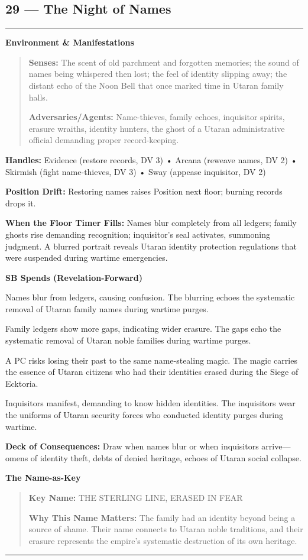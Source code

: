 \documentclass[18pt, letterpaper, twoside]{article}
\newenvironment{floorbox}[1]{%
    \begin{center}
    \begin{minipage}{0.95\textwidth}
    \subsection*{#1}
    \vspace{-0.5em}
    \rule{\textwidth}{0.5pt}
    \vspace{0.5em}
}{%
    \vspace{0.5em}
    \rule{\textwidth}{0.5pt}
    \end{minipage}
    \end{center}
}
\newenvironment{gmnote}[1]{%
    \vspace{0.5em}
    \noindent\textbf{#1}
    \begin{quote}
}{%
    \end{quote}
    \vspace{0.5em}
}
\newcommand{\handles}[1]{\noindent\textbf{Handles:} #1\par}
\newcommand{\sbitem}[2]{\item[#1 SB:] #2}
\newcommand{\deckdraw}[1]{\noindent\textbf{Deck of Consequences:} #1\par}
\newcommand{\keyname}[1]{\noindent\textbf{Key Name:} #1\par}
\newcommand{\nameimportance}[1]{\noindent\textbf{Why This Name Matters:} #1\par}
\begin{document}
\begin{floorbox}{29 --- The Night of Names}
\begin{gmnote}{Environment \& Manifestations}
    \textbf{Senses:} The scent of old parchment and forgotten memories; the sound of names being whispered then lost; the feel of identity slipping away; the distant echo of the Noon Bell that once marked time in Utaran family halls.
    
    \textbf{Adversaries/Agents:} Name-thieves, family echoes, inquisitor spirits, erasure wraiths, identity hunters, the ghost of a Utaran administrative official demanding proper record-keeping.
    \end{gmnote}
    
    \handles{Evidence (restore records, DV 3) • Arcana (reweave names, DV 2) • Skirmish (fight name-thieves, DV 3) • Sway (appease inquisitor, DV 2)}
    
    \textbf{Position Drift:} Restoring names raises Position next floor; burning records drops it.
    
    \textbf{When the Floor Timer Fills:} Names blur completely from all ledgers; family ghosts rise demanding recognition; inquisitor's seal activates, summoning judgment. A blurred portrait reveals Utaran identity protection regulations that were suspended during wartime emergencies.
    
    \textbf{SB Spends (Revelation-Forward)}
    \begin{description}[leftmargin=*, style=unboxed]
        \sbitem{1}{Names blur from ledgers, causing confusion. The blurring echoes the systematic removal of Utaran family names during wartime purges.}
        \sbitem{2}{Family ledgers show more gaps, indicating wider erasure. The gaps echo the systematic removal of Utaran noble families during wartime purges.}
        \sbitem{3}{A PC risks losing their past to the same name-stealing magic. The magic carries the essence of Utaran citizens who had their identities erased during the Siege of Ecktoria.}
        \sbitem{4+}{Inquisitors manifest, demanding to know hidden identities. The inquisitors wear the uniforms of Utaran security forces who conducted identity purges during wartime.}
    \end{description}
    
    \deckdraw{Draw when names blur or when inquisitors arrive---omens of identity theft, debts of denied heritage, echoes of Utaran social collapse.}
    
    \begin{gmnote}{The Name-as-Key}
    \keyname{THE STERLING LINE, ERASED IN FEAR}
    \nameimportance{The family had an identity beyond being a source of shame. Their name connects to Utaran noble traditions, and their erasure represents the empire's systematic destruction of its own heritage.}
    

\end{gmnote}
\end{floorbox}
\end{document}
